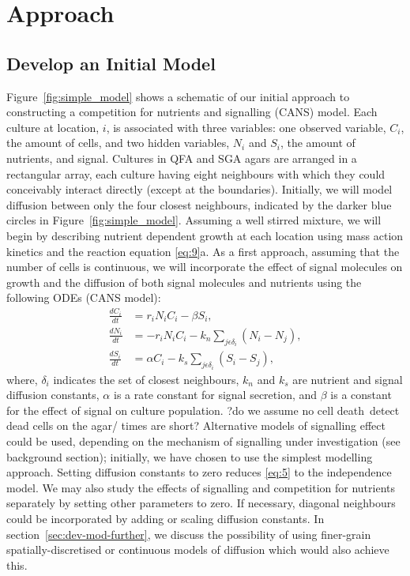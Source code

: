 \graphicspath{{images_low_res/}}
\section{Approach}
\label{sec:approach}

\subsection{Develop an Initial Model}
\label{sec:initial_model}

Figure~\ref{fig:simple_model} shows a schematic of our initial
approach to constructing a competition for nutrients and signalling
(CANS) model. Each culture at location, \(i\), is associated with
three variables: one observed variable, \(C_{i}\), the amount of
cells, and two hidden variables, \(N_{i}\) and \(S_{i}\), the amount
of nutrients, and signal. Cultures in QFA and SGA agars are arranged
in a rectangular array, each culture having eight neighbours with
which they could conceivably interact directly (except at the
boundaries). Initially, we will model diffusion between only the four
closest neighbours, indicated by the darker blue circles in
Figure~\ref{fig:simple_model}. Assuming a well stirred mixture, we
will begin by describing nutrient dependent growth at each location
using mass action kinetics and the reaction equation \ref{eq:9}a.  As
a first approach, assuming that the number of cells is continuous, we
will incorporate the effect of signal molecules on growth and the
diffusion of both signal molecules and nutrients using the following
ODEs (CANS model):
\begin{subequations}
  \label{eq:5}
  \begin{align}
    \frac{dC_{i}}{dt}& = r_{i}N_{i}C_{i} - \beta S_{i},\\
    \frac{dN_{i}}{dt}& = - r_{i}N_{i}C_{i} - k_{n}\sum_{j \epsilon \delta_i}(N_{i} - N_{j}),\\
    \frac{dS_{i}}{dt}& = \alpha C_{i} - k_{s}\sum_{j \epsilon \delta_i}(S_{i} - S_{j}),
  \end{align}
\end{subequations}
where, \(\delta_i\) indicates the set of closest neighbours, \(k_{n}\)
and \(k_{s}\) are nutrient and signal diffusion constants, \(\alpha\)
is a rate constant for signal secretion, and \(\beta\) is a constant
for the effect of signal on culture population. ?do we assume no cell
death\ detect dead cells on the agar/ times are short? Alternative
models of signalling effect could be used, depending on the mechanism
of signalling under investigation (see background section); initially,
we have chosen to use the simplest modelling approach. Setting
diffusion constants to zero reduces \ref{eq:5} to the independence
model. We may also study the effects of signalling and competition for
nutrients separately by setting other parameters to zero. If
necessary, diagonal neighbours could be incorporated by adding or
scaling diffusion constants. In section~\ref{sec:dev-mod-further}, we
discuss the possibility of using finer-grain spatially-discretised or
continuous models of diffusion which would also achieve this.

